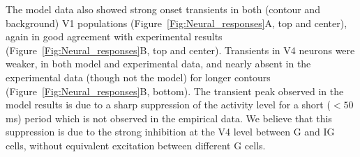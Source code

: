 {The model data also showed strong onset transients in both (contour
and background) V1 populations (Figure~\ref{Fig:Neural_responses}A,
top and center), again in good agreement with experimental results
(Figure~\ref{Fig:Neural_responses}B, top and center). Transients in V4
neurons were weaker, in both model and experimental data, and nearly
absent in the experimental data (though not the model) for longer
contours (Figure~\ref{Fig:Neural_responses}B, bottom).
%
%
%
The transient peak observed in the model results
is due to a sharp suppression of the activity level for a short
($<50$ms) period which is not observed in the empirical data. We
believe that this suppression is due to the  strong inhibition at the
V4 level between G and IG cells, without equivalent
excitation between different G cells.
%
%
%

}

